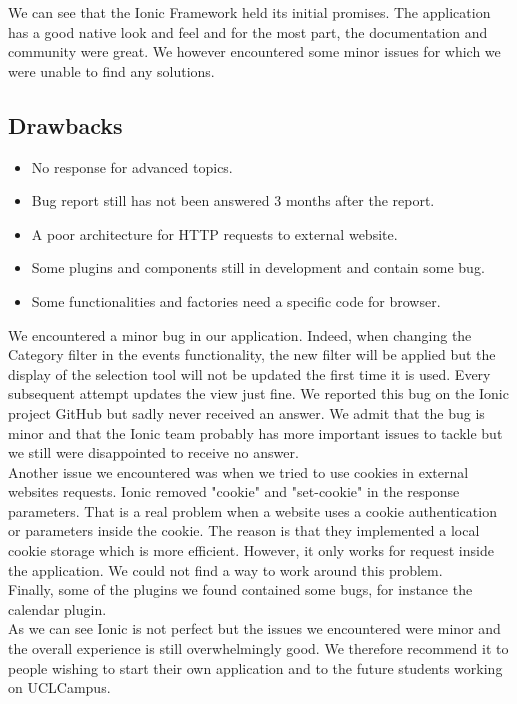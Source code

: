 \documentclass{eplmastersthesis}
\begin{document}
We can see that the Ionic Framework held its initial promises. The application has a good native look and feel and for the most part, the documentation and community were great. We however encountered some minor issues for which we were unable to find any solutions. 

\subsection{Drawbacks}
\begin{itemize}

\item No response for advanced topics. 
\item Bug report still has not been answered 3 months after the report. 
\item A poor architecture for HTTP requests to external website. 
\item Some plugins and components still in development and contain some bug.
\item Some functionalities and factories need a specific code for browser. 

\end{itemize}

We encountered a minor bug in our application. Indeed, when changing the Category filter in the events functionality, the new filter will be applied but the display of the selection tool will not be updated the first time it is used. Every subsequent attempt updates the view just fine. We reported this bug on the Ionic project GitHub but sadly never received an answer. We admit that the bug is minor and that the Ionic team probably has more important issues to tackle but we still were disappointed to receive no answer.\\

Another issue we encountered was when we tried to use cookies in external websites requests. Ionic removed "cookie" and "set-cookie" in the response parameters. That is a real problem when a website uses a cookie authentication or parameters inside the cookie. The reason is that they implemented a local cookie storage which is more efficient. However, it only works for request inside the application.
We could not find a way to work around this problem.\\

Finally, some of the plugins we found contained some bugs, for instance the calendar plugin.\\

As we can see Ionic is not perfect but the issues we encountered were minor and the overall experience is still overwhelmingly good. We therefore recommend it to people wishing to start their own application and to the future students working on UCLCampus.
\end{document}
